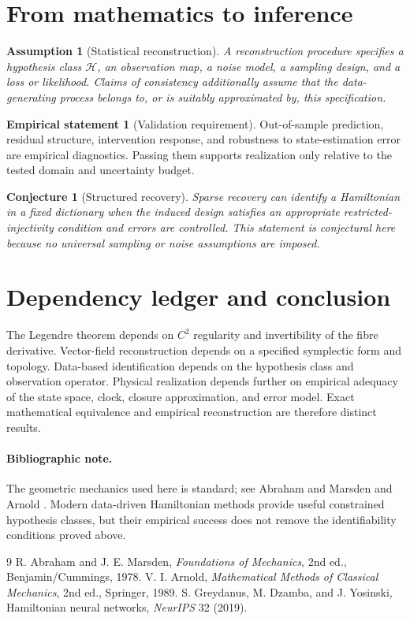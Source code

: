 \documentclass[12pt]{article}
\newtheorem{assumption}[definition]{Assumption}
\newtheorem{conjecture}[definition]{Conjecture}
\theoremstyle{definition}
\newtheorem{empirical}[definition]{Empirical statement}
\begin{document}
\section{From mathematics to inference}
\begin{assumption}[Statistical reconstruction]
A reconstruction procedure specifies a hypothesis class $\mathcal H$, an observation map, a noise model, a sampling design, and a loss or likelihood. Claims of consistency additionally assume that the data-generating process belongs to, or is suitably approximated by, this specification.
\end{assumption}

\begin{empirical}[Validation requirement]
Out-of-sample prediction, residual structure, intervention response, and robustness to state-estimation error are empirical diagnostics. Passing them supports realization only relative to the tested domain and uncertainty budget.
\end{empirical}

\begin{conjecture}[Structured recovery]
Sparse recovery can identify a Hamiltonian in a fixed dictionary when the induced design satisfies an appropriate restricted-injectivity condition and errors are controlled. This statement is conjectural here because no universal sampling or noise assumptions are imposed.
\end{conjecture}

\section{Dependency ledger and conclusion}
The Legendre theorem depends on $C^2$ regularity and invertibility of the fibre derivative. Vector-field reconstruction depends on a specified symplectic form and topology. Data-based identification depends on the hypothesis class and observation operator. Physical realization depends further on empirical adequacy of the state space, clock, closure approximation, and error model. Exact mathematical equivalence and empirical reconstruction are therefore distinct results.

\paragraph{Bibliographic note.}
The geometric mechanics used here is standard; see Abraham and Marsden \cite{AM} and Arnold \cite{Arnold}. Modern data-driven Hamiltonian methods provide useful constrained hypothesis classes, but their empirical success does not remove the identifiability conditions proved above.

\begin{thebibliography}{9}
 R. Abraham and J. E. Marsden, \emph{Foundations of Mechanics}, 2nd ed., Benjamin/Cummings, 1978.
 V. I. Arnold, \emph{Mathematical Methods of Classical Mechanics}, 2nd ed., Springer, 1989.
 S. Greydanus, M. Dzamba, and J. Yosinski, Hamiltonian neural networks, \emph{NeurIPS} 32 (2019).
\end{thebibliography}
\end{document}
